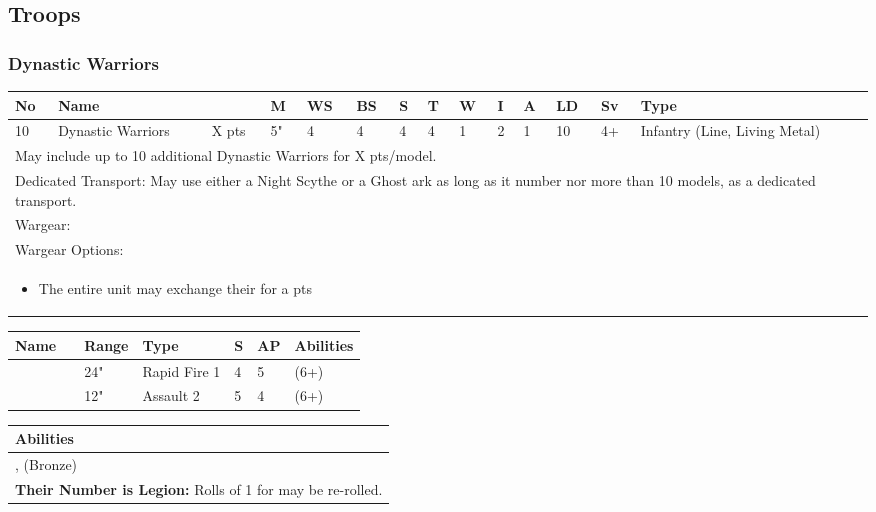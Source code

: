 \subsection{Troops}

\subsubsection{Dynastic Warriors} \label{Dynastic Warriors}

\noindent
\begin{tabular}{||m{10pt} m{90pt} m{30pt} m{11pt} m{11pt} m{11pt} m{11pt} m{11pt} m{11pt} m{11pt} m{11pt} m{11pt} m{11pt} m{135pt}||}
	\hline
	No & Name & & M & WS & BS & S & T & W & I & A & LD & Sv & Type \\
	\hline
	10 & Dynastic Warriors & X pts & 5" & 4 & 4 & 4 & 4 & 1 & 2 & 1 & 10 & 4+ & Infantry (Line, Living Metal)\\
	\hline
	\hline
	\multicolumn{14}{||Z{532 pt}||}{May include up to 10 additional Dynastic Warriors for X pts/model.}\\	
	\multicolumn{14}{||Z{532 pt}||}{Dedicated Transport: May use either a Night Scythe or a Ghost ark as long as it number nor more than 10 models, as a dedicated transport.}\\	
	\hline
	\hline
	\multicolumn{14}{||Z{532 pt}||}{Wargear: \quickref{Gauss Flayer}}\\
	\multicolumn{14}{||Z{532 pt}||}{Wargear Options:} \\	\multicolumn{14}{||Z{532 pt}||}{\begin{itemize}
			\item The entire unit may exchange their \quickref{Gauss Flayer} for a \quickref{Gauss Reaper} \hrulefill 0 pts
	\end{itemize}} \\
	\hline
\end{tabular}

\noindent
\begin{tabular}{||m{110pt} m{30pt} m{31pt} m{55pt} m{12pt} m{12pt} m{210pt}||}
	\hline
	Name & & Range & Type & S & AP & Abilities \\
	\hline
	\quickref{Gauss Flayer} & & 24" & Rapid Fire 1 & 4 & 5 & \quickref{Gauss} (6+) \\
	\quickref{Gauss Reaper} & & 12" & Assault 2 & 5 & 4 & \quickref{Gauss} (6+) \\
	\hline
\end{tabular}

\noindent
\begin{tabular}{||m{532pt}||}
	\hline
	Abilities \\
	\hline
	\quickref{Reanimation Protocols}, \quickref{Soulless Hordes} (Bronze) \\
	\textbf{Their Number is Legion:} Rolls of 1 for \quickref{Reanimation Protocols} may be re-rolled. \\
	\hline
\end{tabular}


